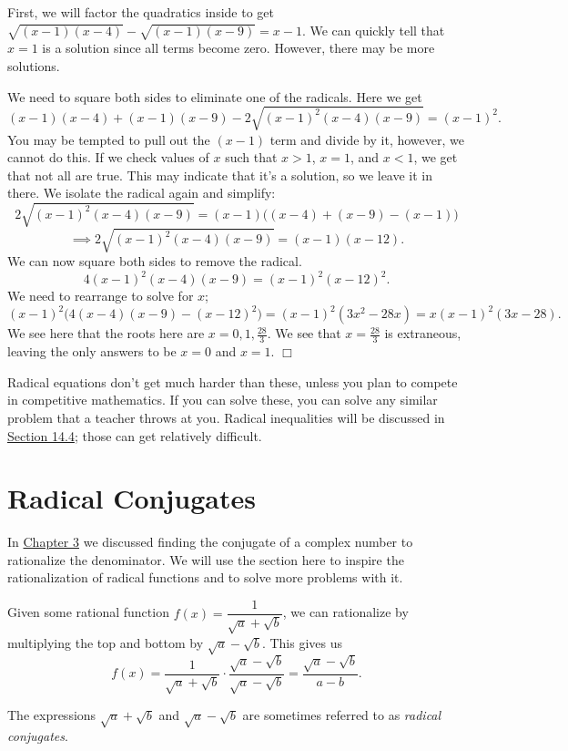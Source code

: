 \documentclass[../book.tex]{subfiles}
\begin{document}
\begin{solution}
First, we will factor the quadratics inside to get $\sqrt{(x-1)(x-4)}-\sqrt{(x-1)(x-9)}=x-1.$ We can quickly tell that $x=1$ is a solution since all terms become zero.  However, there may be more solutions.

We need to square both sides to eliminate one of the radicals.  Here we get $$(x-1)(x-4)+(x-1)(x-9)-2\sqrt{(x-1)^2(x-4)(x-9)}=(x-1)^2.$$ You may be tempted to pull out the $(x-1)$ term and divide by it, however, we cannot do this. If we check values of $x$ such that $x>1$, $x=1$, and $x<1$, we get that not all are true. This may indicate that it's a solution, so we leave it in there. We isolate the radical again and simplify: $$2\sqrt{(x-1)^2(x-4)(x-9)}=(x-1)\big((x-4)+(x-9)-(x-1)\big)$$ $$\implies 2\sqrt{(x-1)^2(x-4)(x-9)}=(x-1)(x-12).$$
We can now square both sides to remove the radical. $$4(x-1)^2(x-4)(x-9)=(x-1)^2(x-12)^2.$$ We need to rearrange to solve for $x$; $$(x-1)^2\big(4(x-4)(x-9)-(x-12)^2\big)=(x-1)^2(3x^2-28x)=x(x-1)^2(3x-28).$$
We see here that the roots here are $x=0,1,\frac{28}{3}.$ We see that $x=\frac{28}{3}$ is extraneous, leaving the only answers to be $x=0$ and $x=1$. $\Box$
\end{solution}
Radical equations don't get much harder than these, unless you plan to compete in competitive mathematics.  If you can solve these, you can solve any similar problem that a teacher throws at you.  Radical inequalities will be discussed in \hyperlink{section.14.4}{Section 14.4}; those can get relatively difficult.
\section{Radical Conjugates}
\noindent In \hyperlink{chapter.3}{Chapter 3} we discussed finding the conjugate of a complex number to rationalize the denominator.  We will use the section here to inspire the rationalization of radical functions and to solve more problems with it.

Given some rational function $f(x)=\dfrac{1}{\sqrt{a}+\sqrt{b}}$, we can rationalize by multiplying the top and bottom by $\sqrt{a}-\sqrt{b}$.  This gives us $$f(x)=\dfrac{1}{\sqrt{a}+\sqrt{b}}\cdot\dfrac{\sqrt{a}-\sqrt{b}}{\sqrt{a}-\sqrt{b}}=\dfrac{\sqrt{a}-\sqrt{b}}{a-b}.$$
\begin{remark}
The expressions $\sqrt{a}+\sqrt{b}$ and $\sqrt{a}-\sqrt{b}$ are sometimes referred to as \textit{radical conjugates}.
\end{remark}
\end{document}
